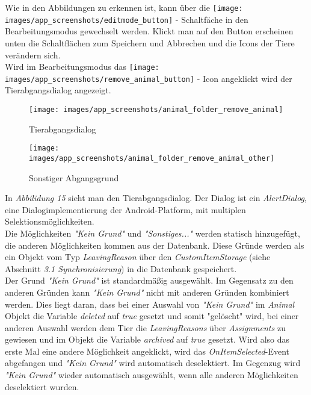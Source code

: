 Wie in den Abbildungen zu erkennen ist, kann über die \texttt{[image: images/app\_screenshots/editmode\_button]} - Schaltfäche in den Bearbeitungsmodus gewechselt werden. Klickt man auf den Button erscheinen unten die Schaltflächen zum Speichern und Abbrechen und die Icons der Tiere verändern sich.\\
Wird im Bearbeitungsmodus das \texttt{[image: images/app\_screenshots/remove\_animal\_button]} - Icon angeklickt wird der Tierabgangsdialog angezeigt.
\begin{figure}[H]
  \centering
  \begin{minipage}[t]{7 cm}
  	\texttt{[image: images/app\_screenshots/animal\_folder\_remove\_animal]} 
    \caption{Tierabgangsdialog}
  \end{minipage}
  \hspace{0.5cm}
  \begin{minipage}[t]{7 cm}
	\texttt{[image: images/app\_screenshots/animal\_folder\_remove\_animal\_other]}  
    \caption{Sonstiger Abgangsgrund}
  \end{minipage}
\end{figure}
In \textit{Abbilidung 15} sieht man den Tierabgangsdialog. Der Dialog ist ein \textit{AlertDialog}, eine Dialogimplementierung der Android-Platform, mit multiplen Selektionsmöglichkeiten. \\
Die Möglichkeiten \textit{"Kein Grund"} und \textit{"Sonstiges..."} werden statisch hinzugefügt, die anderen Möglichkeiten kommen aus der Datenbank. Diese Gründe werden als ein Objekt vom Typ \textit{LeavingReason} über den \textit{CustomItemStorage} (siehe Abschnitt \textit{3.1 Synchronisierung}) in die Datenbank gespeichert.\\
Der Grund \textit{"Kein Grund"} ist standardmäßig ausgewählt. Im Gegensatz zu den anderen Gründen kann \textit{"Kein Grund"} nicht mit anderen Gründen kombiniert werden. Dies liegt daran, dass bei einer Auswahl von \textit{"Kein Grund"} im \textit{Animal} Objekt die Variable \textit{deleted} auf \textit{true} gesetzt und somit "gelöscht" wird, bei einer anderen Auswahl werden dem Tier die \textit{LeavingReasons} über \textit{Assignments} zu gewiesen und im Objekt die Variable \textit{archived} auf \textit{true} gesetzt. Wird also das erste Mal eine andere Möglichkeit angeklickt, wird das \textit{OnItemSelected}-Event abgefangen und \textit{"Kein Grund"} wird automatisch deselektiert. Im Gegenzug wird \textit{"Kein Grund"} wieder automatisch ausgewählt, wenn alle anderen Möglichkeiten deselektiert wurden. \\
